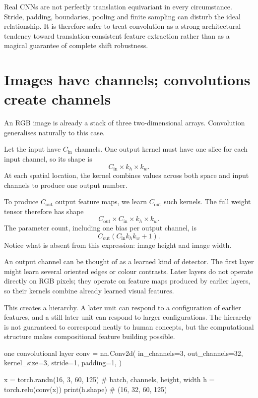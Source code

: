 Real CNNs are not perfectly translation equivariant in every circumstance. Stride, padding, boundaries, pooling and finite sampling can disturb the ideal relationship. It is therefore safer to treat convolution as a strong architectural tendency toward translation-consistent feature extraction rather than as a magical guarantee of complete shift robustness.

\section{Images have channels; convolutions create channels}

An RGB image is already a stack of three two-dimensional arrays. Convolution generalises naturally to this case.

Let the input have \(C_{\mathrm{in}}\) channels. One output kernel must have one slice for each input channel, so its shape is
\[
  C_{\mathrm{in}}\times k_h\times k_w.
\]
At each spatial location, the kernel combines values across both space and input channels to produce one output number.

To produce \(C_{\mathrm{out}}\) output feature maps, we learn \(C_{\mathrm{out}}\) such kernels. The full weight tensor therefore has shape
\[
  C_{\mathrm{out}}\times C_{\mathrm{in}}\times k_h\times k_w.
\]
The parameter count, including one bias per output channel, is
\begin{equation}
  C_{\mathrm{out}}
  \left(C_{\mathrm{in}}k_hk_w + 1\right).
  \label{eq:week5-conv-params}
\end{equation}
Notice what is absent from this expression: image height and image width.

An output channel can be thought of as a learned kind of detector. The first layer might learn several oriented edges or colour contrasts. Later layers do not operate directly on RGB pixels; they operate on feature maps produced by earlier layers, so their kernels combine already learned visual features.

This creates a hierarchy. A later unit can respond to a configuration of earlier features, and a still later unit can respond to larger configurations. The hierarchy is not guaranteed to correspond neatly to human concepts, but the computational structure makes compositional feature building possible.

\begin{pytorchbox}{one convolutional layer}
conv = nn.Conv2d(
    in_channels=3,
    out_channels=32,
    kernel_size=3,
    stride=1,
    padding=1,
)

x = torch.randn(16, 3, 60, 125)  # batch, channels, height, width
h = torch.relu(conv(x))
print(h.shape)                    # (16, 32, 60, 125)
\end{pytorchbox}

